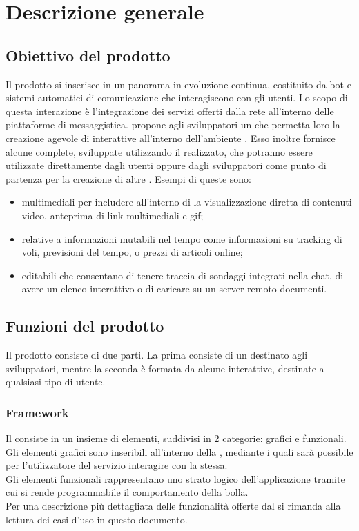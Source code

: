 \section{Descrizione generale}
\subsection{Obiettivo del prodotto}
Il prodotto si inserisce in un panorama in evoluzione continua, costituito da bot e sistemi automatici di comunicazione che interagiscono con gli utenti.
Lo scopo di  questa interazione è l’integrazione dei servizi offerti dalla rete all'interno delle piattaforme di messaggistica. 
\ProjectName{} propone agli sviluppatori un  che permetta loro la creazione agevole di  interattive all'interno dell'ambiente . Esso inoltre fornisce alcune  complete, sviluppate utilizzando il  realizzato, che potranno essere utilizzate direttamente dagli utenti oppure dagli sviluppatori come punto di partenza per la creazione di altre .
Esempi di queste sono: 
\begin{itemize}
	\item {} multimediali per includere all'interno di   la visualizzazione diretta di contenuti video, anteprima di link multimediali e gif;
	\item {} relative a informazioni mutabili nel tempo come informazioni su tracking di voli, previsioni del tempo, o prezzi di articoli online;
	\item {} editabili che consentano di tenere traccia di sondaggi integrati nella chat, di avere un elenco interattivo o di caricare su un server remoto documenti.
\end{itemize}

\subsection{Funzioni del prodotto}
Il prodotto consiste di due parti. La prima consiste di un  destinato agli sviluppatori, mentre la seconda è formata da alcune  interattive, destinate a qualsiasi tipo di utente.

\subsubsection{Framework}
Il  consiste in un insieme di elementi, suddivisi in 2 categorie: grafici e funzionali.\\
Gli elementi grafici sono  inseribili all'interno della , mediante i quali sarà possibile per l'utilizzatore del servizio interagire con la  stessa.\\
Gli elementi funzionali rappresentano uno strato logico dell'applicazione tramite cui si rende programmabile il comportamento della bolla.\\
Per una descrizione più dettagliata delle funzionalità offerte dal  si rimanda alla lettura dei casi d'uso in questo documento.

